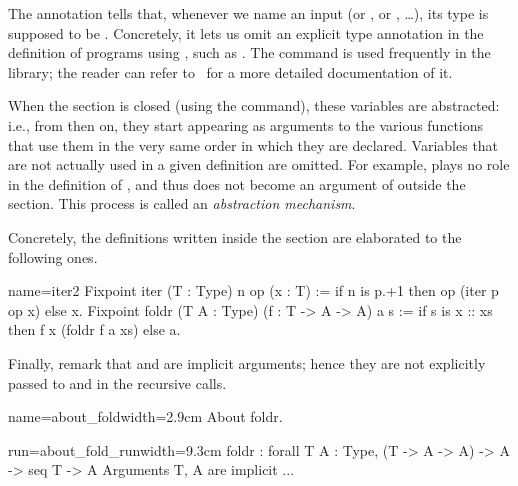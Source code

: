 The  annotation
tells \Coq{} that, whenever we name
an input  (or , or , \ldots), its type is supposed to be
.  Concretely, it lets us omit an explicit type annotation
in the definition of programs using , such as .
The   command is used frequently in the
\mcbMC{} library; the reader can refer to~\cite[``Extensions of Gallina'']{Coq:manual}
for a more detailed documentation of it.

When
the section is closed (using the  command), these variables
are abstracted: i.e., from then on, they start appearing as arguments
to the various functions that use them in the very same
order in which they are declared.
Variables that are not actually used
in a given definition are omitted. For example,  plays no
role in the definition of , and thus does not become an
argument of  outside the section.
This process %
is called
an {\em abstraction mechanism}.

Concretely, the definitions written inside the section are
elaborated to the following ones.

\begin{coq}{name=iter2}{}
Fixpoint iter (T : Type) n op (x : T) :=
  if n is p.+1 then op (iter p op x) else x.
Fixpoint foldr (T A : Type) (f : T -> A -> A) a s :=
  if s is x :: xs then f x (foldr f a xs) else a.
\end{coq}

Finally, remark that  and  are implicit arguments; hence they
are not explicitly passed to  and  in the recursive
calls.

\begin{coq-left}{name=about_fold}{width=2.9cm}
About foldr.
$~$
$~$
\end{coq-left}
\begin{coqout-right}{run=about_fold_run}{width=9.3cm}
foldr : forall T A : Type,
  (T -> A -> A) -> A -> seq T -> A
Arguments T, A are implicit ...
\end{coqout-right}


